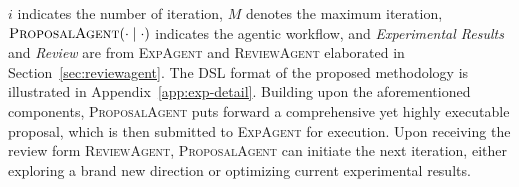 \documentclass{article} %
\newcommand{\ProposalAgent}{\textsc{ProposalAgent}\xspace}
\newcommand{\ExperimentAgent}{\textsc{ExpAgent}\xspace}
\newcommand{\ReviewAgent}{\textsc{ReviewAgent}\xspace}
\newcommand{\DSL}{\textsc{DSL}\xspace}
\begin{document}
$i$ indicates the number of iteration, $M$ denotes the maximum iteration, $\ProposalAgent(\cdot \mid \cdot)$ indicates the agentic workflow, and \textit{Experimental Results} and \textit{Review} are from \ExperimentAgent and \ReviewAgent elaborated in Section~\ref{sec:reviewagent}. The \DSL format of the proposed methodology is illustrated in Appendix~\ref{app:exp-detail}.
Building upon the aforementioned components, \ProposalAgent puts forward a comprehensive yet highly executable proposal, which is then submitted to \ExperimentAgent for execution. Upon receiving the review form \ReviewAgent, \ProposalAgent can initiate the next iteration, either exploring a brand new direction or optimizing current experimental results. %
\end{document}
